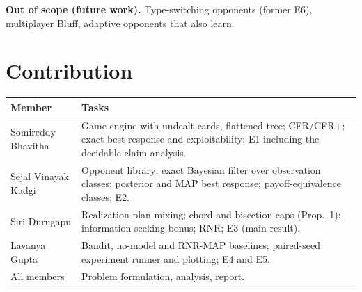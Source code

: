 \documentclass[11pt]{article}
\begin{document}
\textbf{Out of scope (future work).} Type-switching opponents (former E6), multiplayer Bluff, adaptive opponents that also learn.

\section{Contribution}
\begin{center}\small
\begin{tabularx}{\linewidth}{@{}lX@{}}\toprule
Member & Tasks\\\midrule
Somireddy Bhavitha & Game engine with undealt cards, flattened tree; CFR/CFR+; exact best response and exploitability; E1 including the decidable-claim analysis.\\
Sejal Vinayak Kadgi & Opponent library; exact Bayesian filter over observation classes; posterior and MAP best response; payoff-equivalence classes; E2.\\
Siri Durugapu & Realization-plan mixing; chord and bisection caps (Prop.~1); information-seeking bonus; RNR; E3 (main result).\\
Lavanya Gupta & Bandit, no-model and RNR-MAP baselines; paired-seed experiment runner and plotting; E4 and E5.\\
All members & Problem formulation, analysis, report.\\\bottomrule
\end{tabularx}\end{center}
\end{document}
